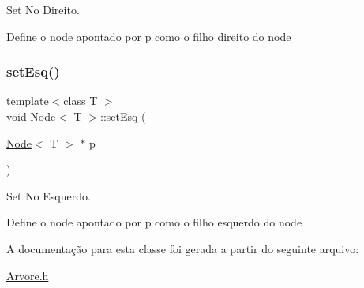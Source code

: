 Set No Direito. 

Define o node apontado por p como o filho direito do node \mbox{\label{classNode_a3022486378d18a2d63d78850668282e3}} 
\subsubsection{\texorpdfstring{set\+Esq()}{setEsq()}}
{\footnotesize\ttfamily template$<$class T $>$ \\
void \hyperlink{classNode}{Node}$<$ T $>$\+::set\+Esq (\begin{DoxyParamCaption}\item[{\hyperlink{classNode}{Node}$<$ T $>$ $\ast$}]{p }\end{DoxyParamCaption})}



Set No Esquerdo. 

Define o node apontado por p como o filho esquerdo do node 

A documentação para esta classe foi gerada a partir do seguinte arquivo\+:\begin{DoxyCompactItemize}
\item 
\hyperlink{Arvore_8h}{Arvore.\+h}\end{DoxyCompactItemize}
